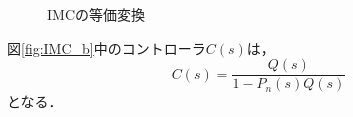 \documentclass[a4paper,12pt]{jarticle}
\begin{document}
\begin{figure}[tbp]
  \begin{center} 
  \hfill
  \end{center}
  \caption{IMCの等価変換}
  \label{fig:henkan}
\end{figure}
%
図\ref{fig:IMC_b}中のコントローラ$C(s)$は，
%
\begin{equation}
 C(s) = \frac{Q(s)}{1 - P_n(s)Q(s)}
\end{equation}
%
となる．
\end{document}
